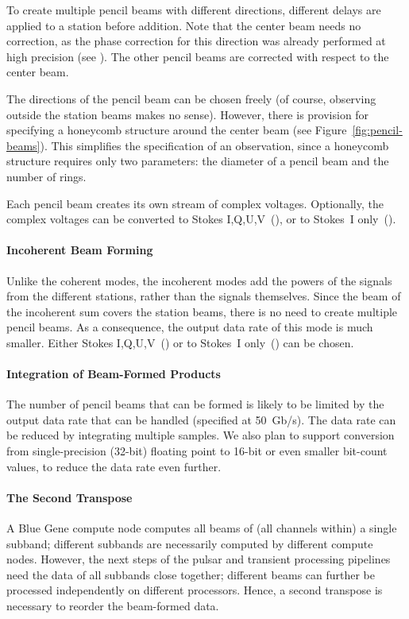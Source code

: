 To create multiple pencil beams with different directions, different delays
are applied to a station before addition.
Note that the center beam needs no correction, as the phase correction for
this direction was already performed at high precision (see ).
The other pencil beams are corrected with respect to the center beam.

The directions of the pencil beam can be chosen freely (of course, observing
outside the station beams makes no sense).
However, there is provision for specifying a honeycomb structure around the
center beam (see Figure~\ref{fig:pencil-beams}).
This simplifies the specification of an observation, since a honeycomb structure
requires only two parameters: the diameter of a pencil beam and the number
of rings.

Each pencil beam creates its own stream of complex voltages.
Optionally, the complex voltages can be converted to Stokes
I,Q,U,V~(), or to Stokes~I only~().


\paragraph{Incoherent Beam Forming}
Unlike the coherent modes, the incoherent modes add the powers of the signals
from the different stations, rather than the signals themselves.
Since the beam of the incoherent sum covers the station beams, there is no
need to create multiple pencil beams.
As a consequence, the output data rate of this mode is much smaller.
Either Stokes I,Q,U,V~() or to Stokes~I
only~() can be chosen.


\paragraph{Integration of Beam-Formed Products }
The number of pencil beams that can be formed is likely to be limited by the
output data rate that can be handled (specified at 50~Gb/s).
The data rate can be reduced by integrating multiple samples.
We also plan to support conversion from single-precision (32-bit) floating
point to 16-bit or even smaller bit-count values, to reduce the data rate
even further.


\paragraph{The Second Transpose }
A Blue Gene compute node computes all beams of (all channels within) a
single subband; different subbands are necessarily computed by different 
compute nodes.
However, the next steps of the pulsar and transient processing pipelines
need the data of all subbands close together; different beams can further be
processed independently on different processors.
Hence, a second transpose is necessary to reorder the beam-formed data.

